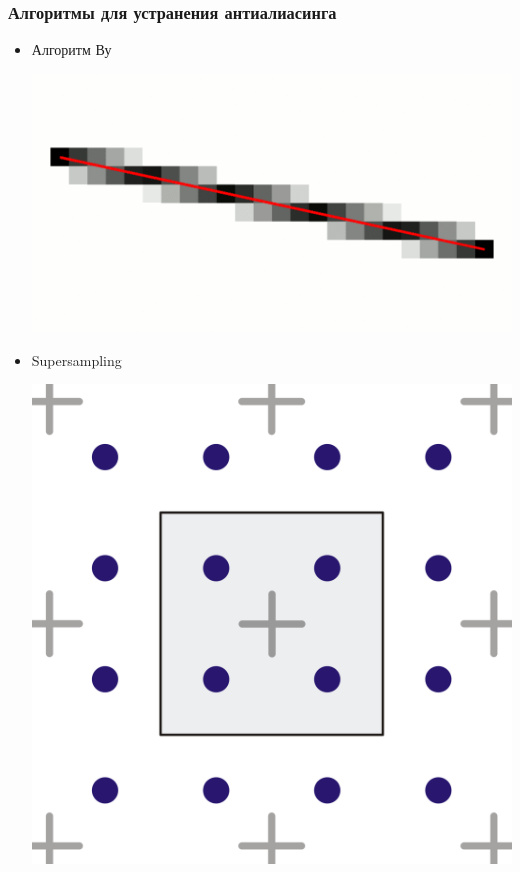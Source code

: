 \documentclass[10pt,pdf,hyperref={unicode}]{beamer}
\begin{document}
\begin{frame}[fragile]
\frametitle{Алгоритмы для устранения антиалиасинга} 
\begin{itemize}
\item Алгоритм Ву\\
\begin{center}
\includegraphics[scale=0.26]{./images/wu.png}
\end{center}
\item Supersampling
\begin{multicols}{2}
\begin{center}
\includegraphics[scale=0.05]{./images/supersampling1.png}
\end{center}

\end{multicols}
\end{itemize}
\end{frame}
\end{document}
